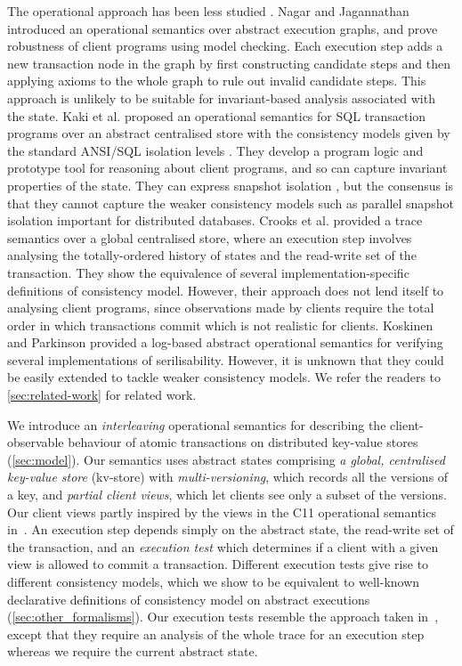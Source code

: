 The operational approach has been less studied \cite{sureshConcur,alonetogether,seebelieve,push-pull}.
Nagar and Jagannathan \citet{sureshConcur} introduced an operational semantics over abstract
execution graphs, and prove robustness of client programs using model
checking. Each execution step adds a new transaction node in the graph
by first constructing candidate steps and then applying axioms to the
whole graph to rule out invalid candidate steps.  This approach is
unlikely to be suitable for invariant-based analysis associated with
the state.  Kaki et al. \citet{alonetogether} proposed an operational semantics for
SQL transaction programs over an abstract centralised store with the consistency
models given by the standard ANSI/SQL isolation levels \cite{si}. They
develop a program logic and prototype tool for reasoning about client
programs, and so can capture invariant properties of the state. They can
express snapshot isolation \cite{si}, but the consensus is
that they cannot
capture the weaker consistency models such as parallel snapshot isolation \cite{PSI} 
important for distributed databases. 
Crooks et al. \citet{seebelieve} provided a trace semantics
over a global centralised store, where an execution step involves
analysing the totally-ordered
history of states and the read-write set of the transaction.
They show the equivalence of several
implementation-specific definitions of consistency model. However, their
approach does not lend itself to  analysing client programs,
since observations made by clients require the total order in
which transactions commit which is not realistic for clients. 
Koskinen and Parkinson \citet{push-pull}
provided a log-based abstract operational semantics for verifying several implementations of serilisability.
However, it is unknown that they could be easily extended to tackle weaker consistency models.
We refer the readers to \cref{sec:related-work} for related work.


We introduce an \emph{interleaving} operational semantics for
describing the client-observable behaviour of atomic transactions on
distributed key-value stores (\cref{sec:model}). Our semantics uses abstract states
comprising \emph{a global, centralised key-value store} (kv-store) with
\emph{multi-versioning}, which records all the versions of a key, and
\emph{partial client views}, which let clients see only a subset of the
versions.  Our client views partly inspired by the views in the C11
operational semantics in~\cite{promises}.  An execution step depends
simply on the abstract state, the read-write set of the transaction, and an \emph{execution test} which
determines if a client with a given view is allowed to commit a
transaction. Different execution tests give rise to different consistency models, 
which we show to be equivalent to well-known
declarative definitions of consistency model on abstract executions (\cref{sec:other_formalisms}).
Our execution tests resemble the  approach taken in~\cite{seebelieve},
except that they require an analysis of the whole trace for an
execution step whereas we require the current abstract state. 




